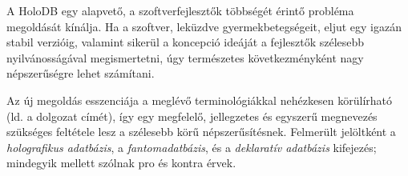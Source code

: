 \documentclass[
    parspace,
    noindent,
    nohyp,
]{elteiktdk}[2023/04/10]
\begin{document}
A HoloDB egy alapvető, a szoftverfejlesztők többségét érintő probléma megoldását kínálja.
Ha a szoftver, leküzdve gyermekbetegségeit, eljut egy igazán stabil verzióig,
valamint sikerül a koncepció ideáját a fejlesztők szélesebb nyilvánosságával megismertetni,
úgy természetes következményként nagy népszerűségre lehet számítani.

Az új megoldás esszenciája a meglévő terminológiákkal nehézkesen körülírható (ld. a dolgozat címét),
így egy megfelelő, jellegzetes és egyszerű megnevezés
szükséges feltétele lesz a szélesebb körű népszerűsítésnek.
Felmerült jelöltként
a \textit{holografikus adatbázis},
a \textit{fantomadatbázis},
és a \textit{deklaratív adatbázis} kifejezés;
mindegyik mellett szólnak pro és kontra érvek.

\pagebreak

\printbibliography[title=\biblabel]
\end{document}
